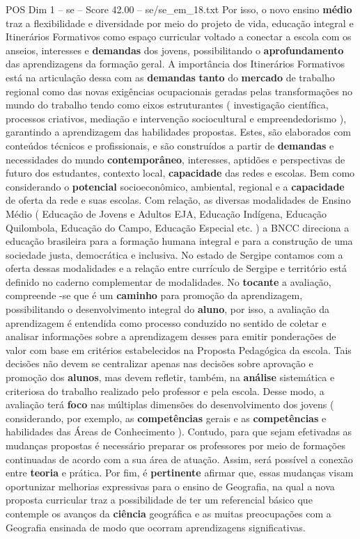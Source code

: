 \begin{textsample}{POS Dim 1 – se – Score 42.00 – se/se\_em\_18.txt}
Por isso, o novo ensino \textbf{médio} traz a flexibilidade e diversidade por meio do projeto de vida, educação integral e Itinerários Formativos como espaço curricular voltado a conectar a escola com os anseios, interesses e \textbf{demandas} dos jovens, possibilitando o \textbf{aprofundamento} das aprendizagens da formação geral.
A importância dos Itinerários Formativos está na articulação dessa com as \textbf{demandas} \textbf{tanto} do \textbf{mercado} de trabalho regional como das novas exigências ocupacionais geradas pelas transformações no mundo do trabalho tendo como eixos estruturantes ( investigação científica, processos criativos, mediação e intervenção sociocultural e empreendedorismo ), garantindo a aprendizagem das habilidades propostas.
Estes, são elaborados com conteúdos técnicos e profissionais, e são construídos a partir de \textbf{demandas} e necessidades do mundo \textbf{contemporâneo}, interesses, aptidões e perspectivas de futuro dos estudantes, contexto local, \textbf{capacidade} das redes e escolas.
Bem como considerando o \textbf{potencial} socioeconômico, ambiental, regional e a \textbf{capacidade} de oferta da rede e suas escolas.
Com relação, as diversas modalidades de Ensino Médio ( Educação de Jovens e Adultos EJA, Educação Indígena, Educação Quilombola, Educação do Campo, Educação Especial etc. ) a BNCC direciona a educação brasileira para a formação humana integral e para a construção de uma sociedade justa, democrática e inclusiva.
No estado de Sergipe contamos com a oferta dessas modalidades e a relação entre currículo de Sergipe e território está definido no caderno complementar de modalidades.
No \textbf{tocante} a avaliação, compreende -se que é um \textbf{caminho} para promoção da aprendizagem, possibilitando o desenvolvimento integral do \textbf{aluno}, por isso, a avaliação da aprendizagem é entendida como processo conduzido no sentido de coletar e analisar informações sobre a aprendizagem desses para emitir ponderações de valor com base em critérios estabelecidos na Proposta Pedagógica da escola.
Tais decisões não devem se centralizar apenas nas decisões sobre aprovação e promoção dos \textbf{alunos}, mas devem refletir, também, na \textbf{análise} sistemática e criteriosa do trabalho realizado pelo professor e pela escola.
Desse modo, a avaliação terá \textbf{foco} nas múltiplas dimensões do desenvolvimento dos jovens ( considerando, por exemplo, as \textbf{competências} gerais e as \textbf{competências} e habilidades das Áreas de Conhecimento ).
Contudo, para que sejam efetivadas as mudanças propostas é necessário preparar os professores por meio de formações continuadas de acordo com a sua área de atuação.
Assim, será possível a conexão entre \textbf{teoria} e prática.
Por fim, é \textbf{pertinente} afirmar que, essas mudanças visam oportunizar melhorias expressivas para o ensino de Geografia, na qual a nova proposta curricular traz a possibilidade de ter um referencial básico que contemple os avanços da \textbf{ciência} geográfica e as muitas preocupações com a Geografia ensinada de modo que ocorram aprendizagens significativas.


\end{textsample}
